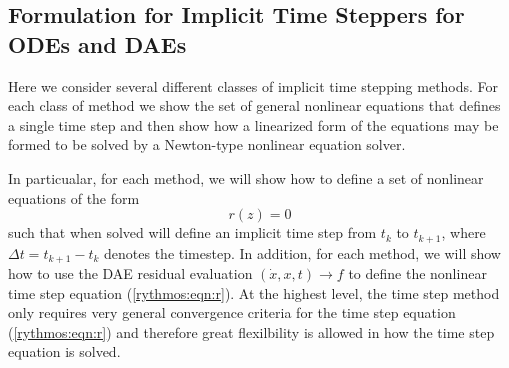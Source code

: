 \documentclass[pdf,ps2pdf,11pt]{SANDreport}
\begin{document}
\subsection{Formulation for Implicit Time Steppers for ODEs and DAEs}

Here we consider several different classes of implicit time stepping methods.
For each class of method we show the set of general nonlinear equations that
defines a single time step and then show how a linearized form of the
equations may be formed to be solved by a Newton-type nonlinear equation
solver.

In particualar, for each method, we will show how to define a set of nonlinear
equations of the form
%
\begin{equation}
r(z) = 0
\label{rythmos:eqn:r}
\end{equation}
%
such that when solved will define an implicit time step from $t_k$ to
$t_{k+1}$, where $\Delta t = t_{k+1} - t_k$ denotes the timestep.  In
addition, for each method, we will show how to use the DAE residual evaluation
$(\dot{x},x,t) {}\rightarrow f$ to define the nonlinear time step equation
(\ref{rythmos:eqn:r}).  At the highest level, the time step method only
requires very general convergence criteria for the time step equation
(\ref{rythmos:eqn:r}) and therefore great flexilbility is allowed in how the
time step equation is solved.
\end{document}
